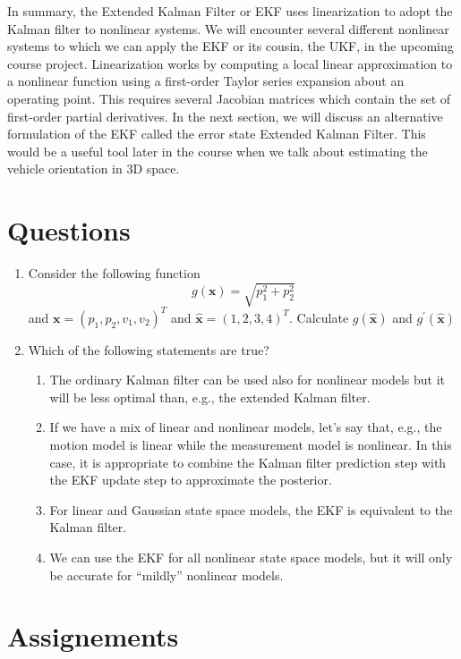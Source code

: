 In summary, the Extended Kalman Filter or EKF uses linearization to adopt
the Kalman filter to nonlinear systems. We will encounter several different nonlinear systems to which we can apply
the EKF or its cousin, the UKF, in the upcoming course project. Linearization works by computing
a local linear approximation to a nonlinear function using a first-order Taylor series expansion
about an operating point. This requires several Jacobian matrices which contain the set of
first-order partial derivatives. In the next section, we will discuss an
alternative formulation of the EKF called the error
state Extended Kalman Filter. This would be a useful tool later
in the course when we talk about estimating the vehicle
orientation in 3D space.

\section{Questions}


\begin{enumerate}
\item Consider the following function 
\begin{equation}
g(\mathbf{x}) = \sqrt{p_{1}^2 + p_{2}^2} 
\end{equation}
and $\mathbf{x} = (p_1, p_2, v_1, v_2)^T$ and $\hat{\mathbf{x}} = (1, 2, 3, 4)^T$. Calculate $g(\hat{\mathbf{x}})$ and $g^{'}(\hat{\mathbf{x}})$

\item Which of the following statements are true?

\begin{enumerate}
\item The ordinary Kalman filter can be used also for nonlinear models but it will be less optimal than, e.g., the extended Kalman filter. 
\item If we have a mix of linear and nonlinear models, let’s say that, e.g., the motion model is linear while the measurement model is nonlinear. 
In this case, it is appropriate to combine the Kalman filter prediction step with the EKF update step to approximate the posterior. 
\item For linear and Gaussian state space models, the EKF is equivalent to the Kalman filter. 
\item We can use the EKF for all nonlinear state space models, but it will only be accurate for “mildly” nonlinear models. 
\end{enumerate}

\end{enumerate}



\section{Assignements}

